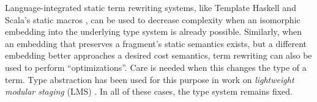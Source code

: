 \documentclass[preprint]{sigplanconf}
\begin{document}
Language-integrated static term rewriting systems, like Template Haskell \cite{SheardPeytonJones:Haskell-02} and Scala's static macros \cite{ScalaMacros2013}, can be used to decrease complexity when an isomorphic embedding into the underlying type system is already possible. %
Similarly, when an embedding that preserves a fragment's static semantics exists, but a different  embedding better approaches a desired cost semantics, term rewriting  can also be used to perform ``optimizations''. Care is needed when this changes the type of a term. Type abstraction has been used for this purpose in work on \emph{lightweight modular staging} (LMS) \cite{Rompf:2012:LMS}. In all of these cases, the type system remains fixed.
\end{document}
